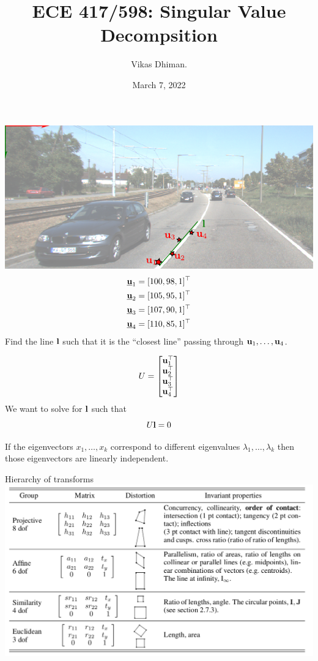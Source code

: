 \documentclass[times,t]{beamer}
\title{ECE 417/598: Singular Value Decompsition }
\author{Vikas Dhiman.  }
\date{March 7, 2022}
\begin{document}
\newcommand{\ubfu}{\underline{\bfu}}
\begin{frame}
  \titlepage
  \end{frame}
\begin{frame}
  \includegraphics[width=\linewidth]{media/lane-from-points.pdf}
  \begin{align*}
    \ubfu_1 &= [100, 98, 1]^\top\\
    \ubfu_2 &= [105, 95, 1]^\top\\
    \ubfu_3 &= [107, 90, 1]^\top\\
    \ubfu_4 &= [110, 85, 1]^\top
    \end{align*}
    Find  the line $\mathbf{l}$ such that it is the ``closest line'' passing through
    $\mathbf{u}_1, \dots, \mathbf{u}_4$.
\end{frame}

\begin{frame}
  \[
  U = \begin{bmatrix}\mathbf{u}_1^\top  \\
    \mathbf{u}_2^\top \\
    \mathbf{u}_3^\top \\
    \mathbf{u}_4^\top
  \end{bmatrix}
  \]
  We want to solve for $\mathbf{l}$ such that
  \[
    U \mathbf{l} = 0
  \]
\end{frame}

\begin{frame}
  If the eigenvectors $x_1, \dots, x_k$ correspond to different eigenvalues
  $\lambda_1, \dots, \lambda_k$ then those eigenvectors are linearly independent.
\end{frame}

\begin{frame}{Hierarchy of transforms}
  \includegraphics[width=\linewidth]{media/hierarchy-of-transforms.png}
\end{frame}
\end{document}
